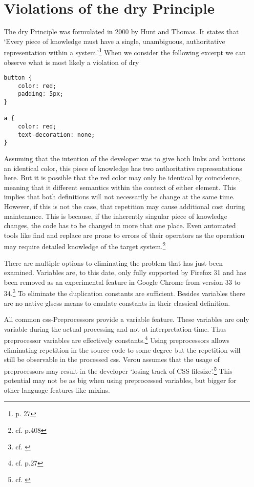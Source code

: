 \section{Violations of the \acrlong{dry} Principle}
The \gls{dry} Principle was formulated in 2000 by Hunt and Thomas.
It states that 
`Every piece of knowledge must have a single, unambiguous, authoritative representation within a system.'\footnote{\cite{pragmaticprogrammer} p. 27}
When we consider the following excerpt we can observe what is most likely a violation of \gls{dry}

\begin{verbatim}
button {
    color: red;
    padding: 5px;
}

a {
    color: red;
    text-decoration: none;
}
\end{verbatim}

Assuming that the intention of the developer was to give both links and buttons an identical color, this piece of knowledge has two authoritative representations here.
But it is possible that the red color may only be identical by coincidence, meaning that it different semantics within the context of either element.
This implies that both definitions will not necessarily be change at the same time.
However, if this is not the case, that repetition may cause additional cost during maintenance.
This is because, if the inherently singular piece of knowledge changes, the code has to be changed in more that one place.
Even automated tools like find and replace are prone to errors of their operators as the operation may require detailed knowledge of the target system.\footnote{cf. \cite{humanautomation} p.408}

There are multiple options to eliminating the problem that has just been examined.
Variables are, to this date, only fully supported by Firefox 31 and has been removed as an experimental feature in Google Chrome from version 33 to 34.\footnote{cf. \cite{cssvariables}}
To eliminate the duplication constants are sufficient.
Besides variables there are no native gls{css} means to emulate constants in their classical definition.

All common \gls{css}-Preprocessors provide a variable feature.
These variables are only variable during the actual processing and not at interpretation-time.
Thus preprocessor variables are effectively constants.\footnote{cf. \cite{wirthpreprocessors} p.27}
Using preprocessors allows eliminating repetition in the source code to some degree
but the repetition will still be observable in the processed \gls{css}.
Verou assumes that the usage of preprocessors may result in the developer `losing track of CSS filesize'.\footnote{cf. \cite{veroupreprocessors}}
This potential may not be as big when using preprocessed variables, but bigger for other language features like mixins.

